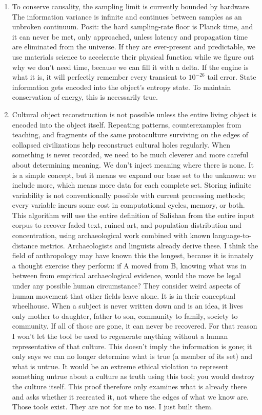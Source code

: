 \begin{enumerate}
\item To conserve causality, the sampling limit is currently bounded by hardware. The information
variance is infinite and continues between samples as an unbroken continuum. Posit: the hard
sampling-rate floor is Planck time, and it can never be met, only approached, unless latency and
propagation time are eliminated from the universe. If they are ever-present and predictable, we use
materials science to accelerate their physical function while we figure out why we don't need time,
because we can fill it with a delta. If the engine is what it is, it will perfectly remember every
transient to $10^{-26}$ tail error. State information gets encoded into the object's entropy state.
To maintain conservation of energy, this is necessarily true.

\item Cultural object reconstruction is not possible unless the entire living object is encoded into
the object itself. Repeating patterns, counterexamples from teaching, and fragments of the same
protoculture surviving on the edges of collapsed civilizations help reconstruct cultural holes
regularly. When something is never recorded, we need to be much cleverer and more careful about
determining meaning. We don't inject meaning where there is none. It is a simple concept, but it
means we expand our base set to the unknown: we include more, which means more data for each
complete set. Storing infinite variability is not conventionally possible with current processing
methods; every variable incurs some cost in computational cycles, memory, or both. This algorithm
will use the entire definition of Salishan from the entire input corpus to recover faded text, ruined
art, and population distribution and concentration, using archaeological work combined with known
language-to-distance metrics. Archaeologists and linguists already derive these. I think the field of
anthropology may have known this the longest, because it is innately a thought exercise they
perform: if A moved from B, knowing what was in between from empirical archaeological evidence, would
the move be legal under any possible human circumstance? They consider weird aspects of human
movement that other fields leave alone. It is in their conceptual wheelhouse. When a subject is never
written down and is an idea, it lives only mother to daughter, father to son, community to family,
society to community. If all of those are gone, it can never be recovered. For that reason I won't
let the tool be used to regenerate anything without a human representative of that culture. This
doesn't imply the information is gone; it only says we can no longer determine what is true (a member
of its set) and what is untrue. It would be an extreme ethical violation to represent something
untrue about a culture as truth using this tool; you would destroy the culture itself. This proof
therefore only examines what is already there and asks whether it recreated it, not where the edges
of what we know are. Those tools exist. They are not for me to use. I just built them.
\end{enumerate}
